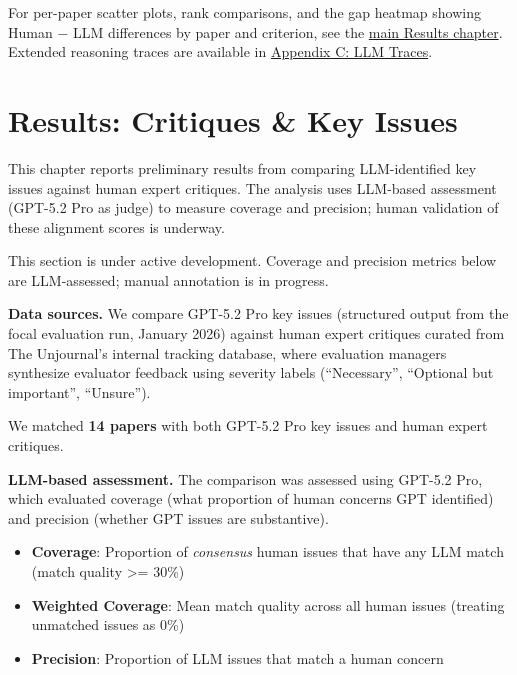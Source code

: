 \documentclass[
  11pt,
  letterpaper,
]{article}
\providecommand{\tightlist}{%
  \setlength{\itemsep}{0pt}\setlength{\parskip}{0pt}}
\begin{document}
For per-paper scatter plots, rank comparisons, and the gap heatmap
showing Human − LLM differences by paper and criterion, see the
\hyperref[results]{main Results chapter}. Extended reasoning traces are
available in \href{appendix_llm_traces.qmd}{Appendix C: LLM Traces}.

\section{Results: Critiques \& Key
Issues}\label{results-critiques-key-issues}

This chapter reports preliminary results from comparing LLM-identified
key issues against human expert critiques. The analysis uses LLM-based
assessment (GPT-5.2 Pro as judge) to measure coverage and precision;
human validation of these alignment scores is underway.

\begin{tcolorbox}[enhanced jigsaw, toptitle=1mm, breakable, opacityback=0, colback=white, rightrule=.15mm, opacitybacktitle=0.6, colbacktitle=quarto-callout-warning-color!10!white, bottomrule=.15mm, leftrule=.75mm, colframe=quarto-callout-warning-color-frame, coltitle=black, bottomtitle=1mm, titlerule=0mm, arc=.35mm, title=\textcolor{quarto-callout-warning-color}{\faExclamationTriangle}\hspace{0.5em}{Warning}, toprule=.15mm, left=2mm]

This section is under active development. Coverage and precision metrics
below are LLM-assessed; manual annotation is in progress.

\end{tcolorbox}

\textbf{Data sources.} We compare GPT-5.2 Pro key issues (structured
output from the focal evaluation run, January 2026) against human expert
critiques curated from The Unjournal's internal tracking database, where
evaluation managers synthesize evaluator feedback using severity labels
(``Necessary'', ``Optional but important'', ``Unsure'').

We matched \textbf{14 papers} with both GPT-5.2 Pro key issues and human
expert critiques.

\textbf{LLM-based assessment.} The comparison was assessed using GPT-5.2
Pro, which evaluated coverage (what proportion of human concerns GPT
identified) and precision (whether GPT issues are substantive).

\begin{itemize}
\tightlist
\item
  \textbf{Coverage}: Proportion of \emph{consensus} human issues that
  have any LLM match (match quality \textgreater= 30\%)
\item
  \textbf{Weighted Coverage}: Mean match quality across all human issues
  (treating unmatched issues as 0\%)
\item
  \textbf{Precision}: Proportion of LLM issues that match a human
  concern
\end{itemize}
\end{document}
